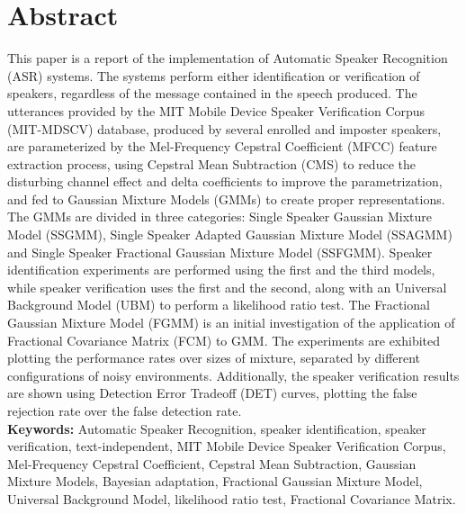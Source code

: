 \chapter*{Abstract}
\label{ch:abstract}

This paper is a report of the implementation of Automatic Speaker Recognition (ASR) systems. The systems perform either identification or verification of speakers, regardless of the message contained in the speech produced. The utterances provided by the MIT Mobile Device Speaker Verification Corpus (MIT-MDSCV) database, produced by several enrolled and imposter speakers, are parameterized by the Mel-Frequency Cepstral Coefficient (MFCC) feature extraction process, using Cepstral Mean Subtraction (CMS) to reduce the disturbing channel effect and delta coefficients to improve the parametrization, and fed to Gaussian Mixture Models (GMMs) to create proper representations. The GMMs are divided in three categories: Single Speaker Gaussian Mixture Model (SSGMM), Single Speaker Adapted Gaussian Mixture Model (SSAGMM) and Single Speaker Fractional Gaussian Mixture Model (SSFGMM). Speaker identification experiments are performed using the first and the third models, while speaker verification uses the first and the second, along with an Universal Background Model (UBM) to perform a likelihood ratio test. The Fractional Gaussian Mixture Model (FGMM) is an initial investigation of the application of Fractional Covariance Matrix (FCM) to GMM. The experiments are exhibited plotting the performance rates over sizes of mixture, separated by different configurations of noisy environments. Additionally, the speaker verification results are shown using Detection Error Tradeoff (DET) curves, plotting the false rejection rate over the false detection rate.
\\

\noindent \textbf{Keywords:} Automatic Speaker Recognition, speaker identification, speaker verification, text-independent, MIT Mobile Device Speaker Verification Corpus, Mel-Frequency Cepstral Coefficient, Cepstral Mean Subtraction, Gaussian Mixture Models, Bayesian adaptation, Fractional Gaussian Mixture Model, Universal Background Model, likelihood ratio test, Fractional Covariance Matrix.